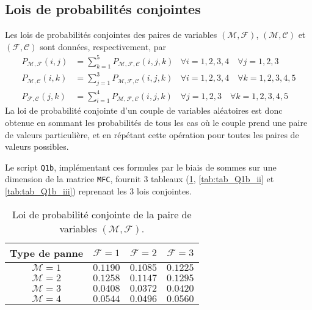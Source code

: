\documentclass[a4paper, 12pt]{article}
\newcommand{\M}{\mathcal{M}}
\newcommand{\F}{\mathcal{F}}
\newcommand{\C}{\mathcal{C}}
\begin{document}
	\subsection{Lois de probabilités conjointes}
	\label{subsec:subsec_Q1b}
	Les lois de probabilités conjointes des paires de variables \(\left(\M,\F\right)\), \(\left(\M,\C\right)\) et \(\left(\F,\C\right)\) sont données, respectivement, par
	\begin{align*}
	    P_{\M,\F}\left(i,j\right) &= \sum_{k=1}^{5}P_{\M,\F,\C}\left(i,j,k\right) & \forall i = 1,2,3,4\quad\forall j = 1,2,3\\
	    P_{\M,\C}\left(i,k\right) &= \sum_{j=1}^{3}P_{\M,\F,\C}\left(i,j,k\right) & \forall i = 1,2,3,4\quad\forall k = 1,2,3,4,5\\
	    P_{\F,\C}\left(j,k\right) &= \sum_{i=1}^{4}P_{\M,\F,\C}\left(i,j,k\right) & \forall j = 1,2,3\quad\forall k = 1,2,3,4,5
	\end{align*}
	La loi de probabilité conjointe d'un couple de variables aléatoires est donc obtenue en sommant les probabilités de tous les cas où le couple prend une paire de valeurs particulière, et en répétant cette opération pour toutes les paires de valeurs possibles.\par
	Le script \texttt{Q1b}, implémentant ces formules par le biais de sommes sur une dimension de la matrice \texttt{MFC}, fournit 3 tableaux (\ref{tab:tab_Q1b_i}, \ref{tab:tab_Q1b_ii} et \ref{tab:tab_Q1b_iii}) reprenant les 3 lois conjointes.\par
	\begin{table}[!ht]
	    \centering
	    \begin{tabular}{|c|c|c|c|}
            \hline
            \textbf{Type de panne} & \textbf{$\F=1$} & \textbf{$\F=2$} & \textbf{$\F=3$}\\
            \hline
            \hline
            \(\textbf{$\M=1$}\) & \(\num{0,1190}\) & \(\num{0,1085}\) & \(\num{0,1225}\)\\
            \hline
            \(\textbf{$\M=2$}\) & \(\num{0,1258}\) & \(\num{0,1147}\) & \(\num{0,1295}\)\\
            \hline
            \(\textbf{$\M=3$}\) & \(\num{0,0408}\) & \(\num{0,0372}\) & \(\num{0,0420}\)\\
            \hline
            \(\textbf{$\M=4$}\) & \(\num{0,0544}\) & \(\num{0,0496}\) & \(\num{0,0560}\)\\
            \hline
        \end{tabular}
        \caption{Loi de probabilité conjointe de la paire de variables \(\left(\M,\F\right)\).}
        \label{tab:tab_Q1b_i}
    \end{table}
\end{document}
